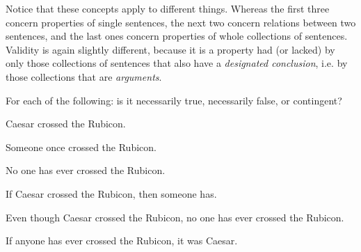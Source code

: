 Notice that these concepts apply to different things. Whereas the first three concern properties of single sentences, the next two concern relations between two sentences, and the last ones concern properties of whole collections of sentences.  Validity is again slightly different, because it is a property had (or lacked) by only those collections of sentences that also have a \emph{designated conclusion}, i.e. by those collections that are \emph{arguments}.    

\practiceproblems
\problempart
\label{pr.EnglishTautology}
For each of the following: is it necessarily true, necessarily false, or contingent?
\begin{earg}
\item Caesar crossed the Rubicon.
\item Someone once crossed the Rubicon.
\item No one has ever crossed the Rubicon.
\item If Caesar crossed the Rubicon, then someone has.
\item Even though Caesar crossed the Rubicon, no one has ever crossed the Rubicon.
\item If anyone has ever crossed the Rubicon, it was Caesar.
\end{earg}

